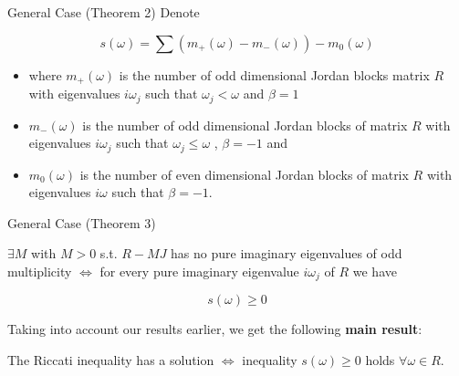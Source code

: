 \begin{frame}{General Case (Theorem 2)}
Denote 

$$ s(\omega) = \sum (m_{+}(\omega)-m_{-}(\omega)) - m_{0}(\omega)$$

\begin{itemize}

\item where $m_{+}(\omega)$ is the number of odd dimensional Jordan blocks matrix $R$ with eigenvalues $i\omega_{j}$ such that $\omega_{j} < \omega$ and $\beta =1$

\item $m_{-}(\omega)$ is the number of odd dimensional Jordan blocks of matrix $R$ with eigenvalues $i\omega_{j}$ such that $\omega_{j} \le \omega$ , $\beta =-1$ and 

\item $m_{0}(\omega)$ is the number of even dimensional Jordan blocks of matrix $R$ with eigenvalues $i\omega$ such that $\beta=-1$. 

\end{itemize}




\end{frame}


\begin{frame}{General Case (Theorem 3)}

\begin{theorem}

$\exists M$ with $ M > 0$ s.t. $R-MJ$ has no pure imaginary eigenvalues of odd multiplicity $\iff$ for every pure imaginary eigenvalue $i\omega_{j}$ of $R$ we have

\begin{equation*}\label{main}  
s(\omega)\ge 0
\end{equation*}

\end{theorem}


Taking into account our results earlier, we get the following {\bf main result}:



\begin{theorem}

The Riccati inequality  has a solution $\iff$ inequality $s(\omega)\ge 0$ holds $\forall \omega\in R$.

\end{theorem}


\end{frame}



